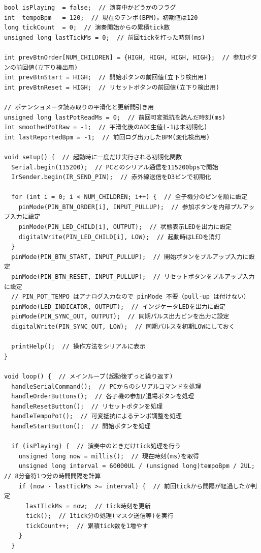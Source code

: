 \documentclass[uplatex,dvipdfmx]{jlreq}
\begin{document}
\begin{lstlisting}
bool isPlaying  = false;  // 演奏中かどうかのフラグ
int  tempoBpm   = 120;  // 現在のテンポ(BPM)。初期値は120
long tickCount  = 0;  // 演奏開始からの累積tick数
unsigned long lastTickMs = 0;  // 前回tickを打った時刻(ms)

int prevBtnOrder[NUM_CHILDREN] = {HIGH, HIGH, HIGH, HIGH};  // 参加ボタンの前回値(立下り検出用)
int prevBtnStart = HIGH;  // 開始ボタンの前回値(立下り検出用)
int prevBtnReset = HIGH;  // リセットボタンの前回値(立下り検出用)

// ポテンショメータ読み取りの平滑化と更新間引き用
unsigned long lastPotReadMs = 0;  // 前回可変抵抗を読んだ時刻(ms)
int smoothedPotRaw = -1;  // 平滑化後のADC生値(-1は未初期化)
int lastReportedBpm = -1;  // 前回ログ出力したBPM(変化検出用)

void setup() {  // 起動時に一度だけ実行される初期化関数
  Serial.begin(115200);  // PCとのシリアル通信を115200bpsで開始
  IrSender.begin(IR_SEND_PIN);  // 赤外線送信をD3ピンで初期化

  for (int i = 0; i < NUM_CHILDREN; i++) {  // 全子機分のピンを順に設定
    pinMode(PIN_BTN_ORDER[i], INPUT_PULLUP);  // 参加ボタンを内部プルアップ入力に設定
    pinMode(PIN_LED_CHILD[i], OUTPUT);  // 状態表示LEDを出力に設定
    digitalWrite(PIN_LED_CHILD[i], LOW);  // 起動時はLEDを消灯
  }
  pinMode(PIN_BTN_START, INPUT_PULLUP);  // 開始ボタンをプルアップ入力に設定
  pinMode(PIN_BTN_RESET, INPUT_PULLUP);  // リセットボタンをプルアップ入力に設定
  // PIN_POT_TEMPO はアナログ入力なので pinMode 不要（pull-up は付けない）
  pinMode(LED_INDICATOR, OUTPUT);  // インジケータLEDを出力に設定
  pinMode(PIN_SYNC_OUT, OUTPUT);  // 同期パルス出力ピンを出力に設定
  digitalWrite(PIN_SYNC_OUT, LOW);  // 同期パルスを初期LOWにしておく

  printHelp();  // 操作方法をシリアルに表示
}

void loop() {  // メインループ(起動後ずっと繰り返す)
  handleSerialCommand();  // PCからのシリアルコマンドを処理
  handleOrderButtons();  // 各子機の参加/退場ボタンを処理
  handleResetButton();  // リセットボタンを処理
  handleTempoPot();  // 可変抵抗によるテンポ調整を処理
  handleStartButton();  // 開始ボタンを処理

  if (isPlaying) {  // 演奏中のときだけtick処理を行う
    unsigned long now = millis();  // 現在時刻(ms)を取得
    unsigned long interval = 60000UL / (unsigned long)tempoBpm / 2UL;  // 8分音符1つ分の時間間隔を計算
    if (now - lastTickMs >= interval) {  // 前回tickから間隔が経過したか判定
      lastTickMs = now;  // tick時刻を更新
      tick();  // 1tick分の処理(マスク送信等)を実行
      tickCount++;  // 累積tick数を1増やす
    }
  }


\end{lstlisting}
\end{document}
